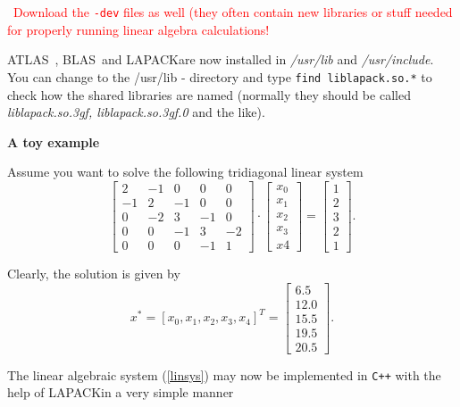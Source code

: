 \documentclass[a4paper,12pt]{article}
\newcommand{\lapack}{\textsc{LAPACK}}
\newcommand{\blas}{\textsc{BLAS}\ }
\newcommand{\atlas}{\textsc{ATLAS}\ }
\newcommand{\dyeitred}{\textcolor{red}}{}
\begin{document}
\dyeitred{\Stopsign \ Download the \texttt{-dev} files as well (they often contain new libraries or stuff needed for properly running linear algebra calculations!}

\medskip
\atlas, \blas and \lapack are now installed in \textit{/usr/lib} and \textit{/usr/include}.\\
You can change to the /usr/lib - directory and type \texttt{find liblapack.so.*} to check how the shared libraries are named (normally they should be called \textit{liblapack.so.3gf, liblapack.so.3gf.0} and the like).


\medskip
\begin{center}
 \Large {\textbf{\textsf{A toy example}}}
\end{center}
Assume you want to solve the following tridiagonal linear system
\begin{equation}
  \label{linsys}
 \begin{bmatrix}
    2  & -1 &  0 & 0 &  0 \\
    -1 &  2 & -1 &  0 &  0\\
    0  & -2 & 3  &-1 &  0 \\
    0  & 0  &-1  & 3  &-2  \\
    0   &0 & 0   & -1 & 1 
\end{bmatrix}
\cdot 
\begin{bmatrix} x_0\\ x_1\\ x_2\\x_3\\x4\end{bmatrix}
= \begin{bmatrix} 1\\ 2\\ 3\\2\\1\end{bmatrix}.
\end{equation}

Clearly, the solution is given by
\begin{equation*}
  x^* = [x_0, x_1, x_2, x_3, x_4]^{T} =
  \begin{bmatrix} 6.5\\ 12.0\\ 15.5\\19.5\\20.5\end{bmatrix}.
\end{equation*}

The linear algebraic system (\ref{linsys}) may now be implemented in \texttt{C++} with the help of \lapack in a very simple manner 

\end{document}
